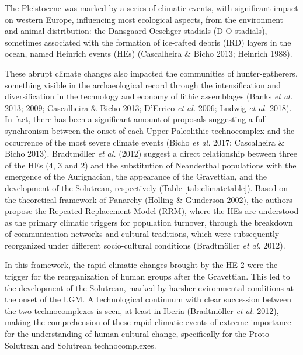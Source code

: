 \documentclass[12pt,twoside]{reedthesis}
\begin{document}
The Pleistocene was marked by a series of climatic events, with significant impact on western Europe, influencing most ecological aspects, from the environment and animal distribution: the Dansgaard-Oeschger stadials (D-O stadials), sometimes associated with the formation of ice-rafted debris (IRD) layers in the ocean, named Heinrich events (HEs) (Cascalheira \& Bicho 2013; Heinrich 1988).

These abrupt climate changes also impacted the communities of hunter-gatherers, something visible in the archaeological record through the intensification and diversification in the technology and economy of lithic assemblages (Banks \emph{et al.} 2013; 2009; Cascalheira \& Bicho 2013; D'Errico \emph{et al.} 2006; Ludwig \emph{et al.} 2018). In fact, there has been a significant amount of proposals suggesting a full synchronism between the onset of each Upper Paleolithic technocomplex and the occurrence of the most severe climate events (Bicho \emph{et al.} 2017; Cascalheira \& Bicho 2013). Bradtmöller \emph{et al.} (2012) suggest a direct relationship between three of the HEs (4, 3 and 2) and the substitution of Neanderthal populations with the emergence of the Aurignacian, the appearance of the Gravettian, and the development of the Solutrean, respectively (Table \ref{tab:climatetable}). Based on the theoretical framework of Panarchy (Holling \& Gunderson 2002), the authors propose the Repeated Replacement Model (RRM), where the HEs are understood as the primary climatic triggers for population turnover, through the breakdown of communication networks and cultural traditions, which were subsequently reorganized under different socio-cultural conditions (Bradtmöller \emph{et al.} 2012).

In this framework, the rapid climatic changes brought by the HE 2 were the trigger for the reorganization of human groups after the Gravettian. This led to the development of the Solutrean, marked by harsher evironmental conditions at the onset of the LGM. A technological continuum with clear succession between the two technocomplexes is seen, at least in Iberia (Bradtmöller \emph{et al.} 2012), making the comprehension of these rapid climatic events of extreme importance for the understanding of human cultural change, specifically for the Proto-Solutrean and Solutrean technocomplexes.
\end{document}
